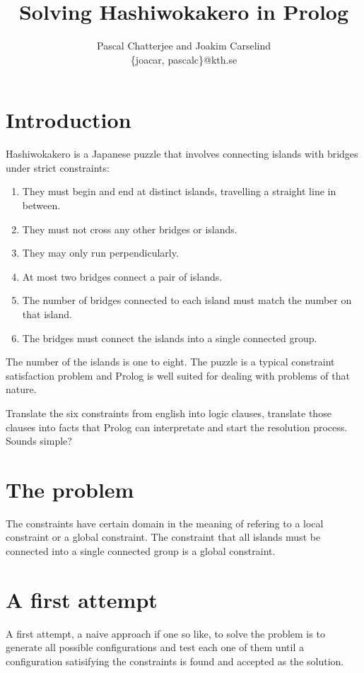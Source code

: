 \documentclass[a4paper,12pt]{article}
\title{Solving Hashiwokakero in Prolog}
\author{Pascal Chatterjee and Joakim Carselind \\ \small{\{joacar, pascalc\}@kth.se}}
\begin{document}
\maketitle

\section*{Introduction}
Hashiwokakero is a Japanese puzzle that involves connecting islands with bridges under strict constraints:
\begin{enumerate}
	\item They must begin and end at distinct islands, travelling a straight line in between.
	\item They must not cross any other bridges or islands.
	\item They may only run perpendicularly.
	\item At most two bridges connect a pair of islands.
	\item The number of bridges connected to each island must match the number on that island.
	\item The bridges must connect the islands into a single connected group.
\end{enumerate}
The number of the islands is one to eight.
The puzzle is a typical constraint satisfaction problem and Prolog is well suited for dealing with problems of that nature.

Translate the six constraints from english into logic clauses, translate those clauses into facts that Prolog can interpretate and start the resolution process. Sounds simple?

\section*{The problem}
The constraints have certain domain in the meaning of refering to a local constraint or a global constraint. The constraint that all islands must be connected into a single connected group is a global constraint.

\section*{A first attempt}
A first attempt, a naive approach if one so like, to solve the problem is to generate all possible configurations and test each one of them until a configuration satisifying the constraints is found and accepted as the solution.
\end{document}
